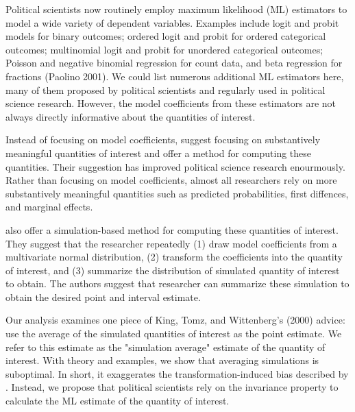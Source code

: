 \documentclass[11pt]{article}
\begin{document}
\thispagestyle{empty}

\onehalfspace

Political scientists now routinely employ maximum likelihood (ML) estimators to model a wide variety of dependent variables. 
Examples include logit and probit models for binary outcomes; ordered logit and probit for ordered categorical outcomes; multinomial logit and probit for unordered categorical outcomes; Poisson and negative binomial regression for count data, and beta regression for fractions (Paolino 2001). 
We could list numerous additional ML estimators here, many of them proposed by political scientists and regularly used in political science research. 
However, the model coefficients from these estimators are not always directly informative about the quantities of interest.

Instead of focusing on model coefficients, \cite{KingTomzWittenberg2000} suggest focusing on substantively meaningful quantities of interest and offer a method for computing these quantities. 
Their suggestion has improved political science research enourmously.
Rather than focusing on model coefficients, almost all researchers rely on more substantively meaningful quantities such as predicted probabilities, first diffences, and marginal effects.

\cite{KingTomzWittenberg2000} also offer a simulation-based method for computing these quantities of interest. 
They suggest that the researcher repeatedly (1) draw model coefficients from a multivariate normal distribution, (2) transform the coefficients into the quantity of interest, and (3) summarize the distribution of simulated quantity of interest to obtain. 
The authors suggest that researcher can summarize these simulation to obtain the desired point and interval estimate.

Our analysis examines one piece of King, Tomz, and Wittenberg's (2000) advice: use the average of the simulated quantities of interest as the point estimate. 
We refer to this estimate as the "simulation average" estimate of the quantity of interest.
With theory and examples, we show that averaging simulations is suboptimal. 
In short, it exaggerates the transformation-induced bias described by \cite{Rainey2017}.
Instead, we propose that political scientists rely on the invariance property to calculate the ML estimate of the quantity of interest.
\end{document}
